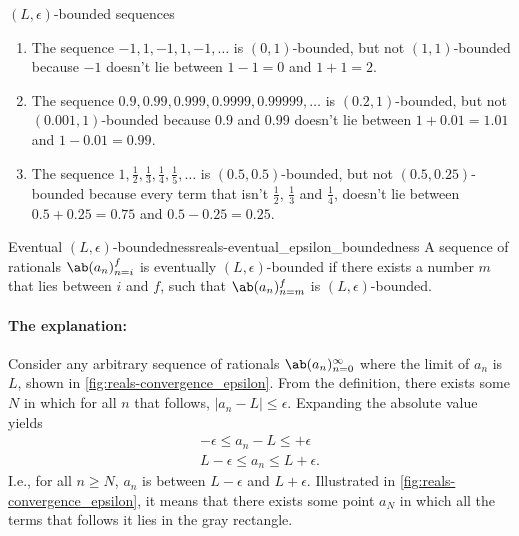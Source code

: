 \begin{exmp}{$(L, \epsilon)$-bounded sequences}{}
  \begin{enumerate}
    \item The sequence $-1, 1, -1, 1, -1, \dots$ is $(0, 1)$-bounded, but not
          $(1, 1)$-bounded because $-1$ doesn't lie between $1 - 1 = 0$ and $1 + 1 = 2$.
    \item The sequence $0.9, 0.99, 0.999, 0.9999, 0.99999, \dots$ is $(0.2, 1)$-bounded,
          but not $(0.001, 1)$-bounded because $0.9$ and $0.99$ doesn't lie between
          $1 + 0.01 = 1.01$ and $1 - 0.01 = 0.99$.
    \item The sequence $1, \frac{1}{2}, \frac{1}{3}, \frac{1}{4}, \frac{1}{5}, \dots$
          is $(0.5, 0.5)$-bounded, but not $(0.5, 0.25)$-bounded because every term
          that isn't $\frac{1}{2}$, $\frac{1}{3}$ and $\frac{1}{4}$, doesn't lie between
          $0.5 + 0.25 = 0.75$ and $0.5 - 0.25 = 0.25$.
  \end{enumerate}
\end{exmp}

\begin{df}{Eventual $(L, \epsilon)$-boundedness}{reals-eventual_epsilon_boundedness}
  A sequence of rationals $\sequence{a_n}{n = i}{f}$ is eventually $(L, \epsilon)$-bounded
  if there exists a number $m$ that lies between $i$ and $f$, such that $\sequence{a_n}{n = m}{f}$
  is $(L, \epsilon)$-bounded.
\end{df}

\paragraph{The explanation:}

Consider any arbitrary sequence of rationals $\sequence{a_n}{n = 0}{\infty}$ where the
limit of $a_n$ is $L$, shown in \cref{fig:reals-convergence_epsilon}. From the definition,
there exists some $N$ in which for all $n$ that follows, $|a_n - L| \leq \epsilon$.
Expanding the absolute value yields
\begin{gather}
  - \epsilon \leq a_n - L \leq + \epsilon  \\
  L - \epsilon \leq a_n \leq L + \epsilon.
\end{gather}
I.e., for all $n \geq N$, $a_n$ is between $L - \epsilon$ and $L + \epsilon$. Illustrated
in \cref{fig:reals-convergence_epsilon}, it means that there exists some point $a_N$
in which all the terms that follows it lies in the gray rectangle.

